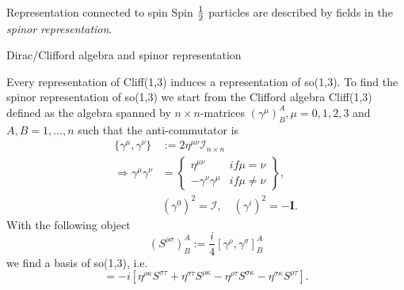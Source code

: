 \begin{mybox}{Representation connected to spin }
	Spin $\frac{1}{2}$ particles are described by fields in the \emph{spinor representation}.
\end{mybox}
\begin{mybox}{Dirac/Clifford algebra and spinor representation}
	
	Every representation of Cliff(1,3) induces a representation of so(1,3). To find the spinor representation of so(1,3) we start from the Clifford algebra Cliff(1,3) defined as the algebra spanned by $n \times n$-matrices $(\gamma^{\mu})^A_B, \mu=0,1,2,3$ and $A,B=1,\dots,n$ such that the anti-commutator is
	\begin{align}
		\{\gamma^{\mu}, \gamma^{\nu} \} & := 2 \eta^{\mu \nu} \mathcal{I}_{n\times n} \\
		\Rightarrow \gamma^{\mu} \gamma^{\nu} &= 
		\left\{ \begin{array}{lr}
			\eta^{\mu \nu} & if \mu =\nu \\
			- \gamma^{\nu} \gamma^{\mu} & if \mu\neq \nu
		\end{array}		\right\},
		\\
		&(\gamma^0)^2=\mathcal{I},\quad (\gamma^i)^2 = - \mathbf{I}.
	\end{align}
	With the following object 
	\begin{equation}
	(S^{\rho \sigma})^A_B := \frac{i}{4} [\gamma^{\rho},\gamma^{\sigma}]^A_B
	\end{equation}
	we find a basis of so(1,3), i.e.
	\begin{equation}
	[S^{\rho \sigma}, S^{\tau \kappa} ] = -i \left[\eta^{\rho \kappa} S^{\sigma \tau} + \eta^{\sigma \tau} S^{\rho \kappa} - \eta^{\rho \tau} S^{\sigma \kappa} - \eta^{\sigma \kappa} S^{\rho \tau} \right].
	\end{equation}
\end{mybox}

